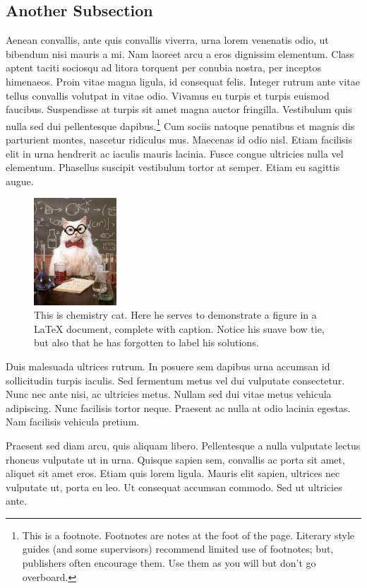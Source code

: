 \subsection{Another Subsection}
Aenean convallis, ante quis convallis viverra, urna lorem venenatis odio, ut bibendum nisi mauris a mi. Nam laoreet arcu a eros dignissim elementum. Class aptent taciti sociosqu ad litora torquent per conubia nostra, per inceptos himenaeos. Proin vitae magna ligula, id consequat felis. Integer rutrum ante vitae tellus convallis volutpat in vitae odio. Vivamus eu turpis et turpis euismod faucibus. Suspendisse at turpis sit amet magna auctor fringilla. Vestibulum quis nulla sed dui pellentesque dapibus.\footnote{This is a footnote. Footnotes are notes at the foot of the page. Literary style guides (and some supervisors) recommend limited use of footnotes; but, publishers often encourage them. Use them as you will but don't go overboard.} Cum sociis natoque penatibus et magnis dis parturient montes, nascetur ridiculus mus. Maecenas id odio nisl. Etiam facilisis elit in urna hendrerit ac iaculis mauris lacinia. Fusce congue ultricies nulla vel elementum. Phasellus suscipit vestibulum tortor at semper. Etiam eu sagittis augue.\cite{bioluminescence,clayden_orgchem}
\begin{figure}
\centering
\includegraphics[height=4cm]{figures/example.jpg}
\caption[Chemistry cat.]{This is chemistry cat. Here he serves to demonstrate a figure in a LaTeX document, complete with caption. Notice his suave bow tie, but also that he has forgotten to label his solutions.}
\end{figure}
Duis malesuada ultrices rutrum. In posuere sem dapibus urna accumsan id sollicitudin turpis iaculis. Sed fermentum metus vel dui vulputate consectetur. Nunc nec ante nisi, ac ultricies metus. Nullam sed dui vitae metus vehicula adipiscing. Nunc facilisis tortor neque. Praesent ac nulla at odio lacinia egestas. Nam facilisis vehicula pretium.

Praesent sed diam arcu, quis aliquam libero. Pellentesque a nulla vulputate lectus rhoncus vulputate ut in urna. Quisque sapien sem, convallis ac porta sit amet, aliquet sit amet eros. Etiam quis lorem ligula. Mauris elit sapien, ultrices nec vulputate ut, porta eu leo. Ut consequat accumsan commodo. Sed ut ultricies ante.

